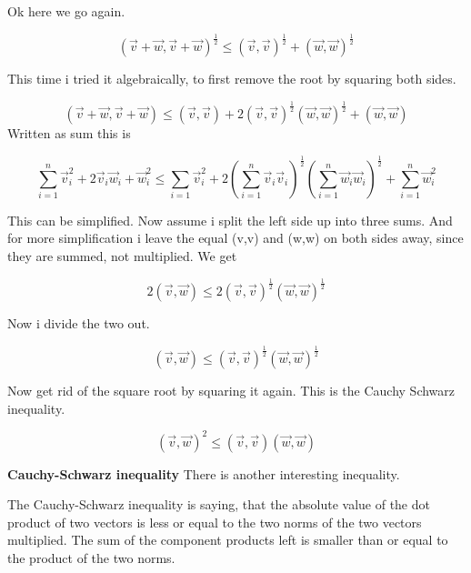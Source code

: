 \documentclass[a4paper]{article}
\begin{document}
Ok here we go again.

\begin{displaymath}
(\vec{v}+\vec{w}, \vec{v}+\vec{w})^{\frac{1}{2}} \leq (\vec{v},\vec{v})^{\frac{1}{2}}+(\vec{w},\vec{w})^{\frac{1}{2}}
\end{displaymath}

 This time i tried it algebraically, to first remove the root by squaring both sides. 

\begin{displaymath}
(\vec{v}+\vec{w}, \vec{v}+\vec{w}) \leq (\vec{v},\vec{v}) + 2(\vec{v},\vec{v})^{\frac{1}{2}}(\vec{w},\vec{w})^{\frac{1}{2}} + (\vec{w},\vec{w})
\end{displaymath}
Written as sum this is

\begin{displaymath}
\sum_{i=1}^{n}\vec{v}_{i}^{2}+2\vec{v}_{i}\vec{w}_{i}+\vec{w}_{i}^{2} \leq \sum_{i=1}\vec{v}_{i}^{2}+2(\sum_{i=1}^{n}\vec{v}_{i}\vec{v}_{i})^{\frac{1}{2}}(\sum_{i=1}^{n}\vec{w}_{i}\vec{w}_{i})^{\frac{1}{2}}+\sum_{i=1}^{n}\vec{w}_{i}^{2}
\end{displaymath}

This can be simplified. Now assume i split the left side up into three sums. And for more simplification i leave the equal (v,v) and (w,w) on both sides away, since they are summed, not multiplied. We get

\begin{displaymath}
2(\vec{v},\vec{w}) \leq 2(\vec{v},\vec{v})^{\frac{1}{2}}(\vec{w},\vec{w})^{\frac{1}{2}}
\end{displaymath}

Now i divide the two out. 

\begin{displaymath}
(\vec{v},\vec{w}) \leq (\vec{v},\vec{v})^{\frac{1}{2}}(\vec{w},\vec{w})^{\frac{1}{2}}
\end{displaymath}

Now get rid of the square root by squaring it again. This is the Cauchy Schwarz inequality.

\begin{displaymath}
(\vec{v},\vec{w})^{2} \leq (\vec{v},\vec{v})(\vec{w},\vec{w})
\end{displaymath}


\textbf{Cauchy-Schwarz inequality} There is another interesting inequality.

The Cauchy-Schwarz inequality is saying, that the absolute value of the dot product of two vectors is less or equal to the two norms of the two vectors multiplied. The sum of the component products left is smaller than or equal to the product of the two norms.\\
\end{document}

